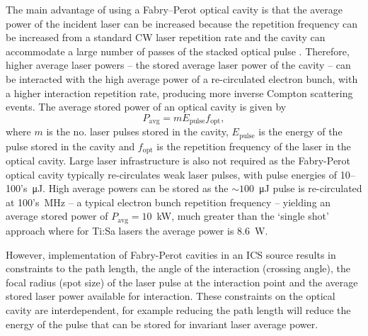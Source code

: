 \documentclass[../main.tex]{subfiles}
\begin{document}
The main advantage of using a Fabry--Perot optical cavity is that the average power of the incident laser can be increased because the repetition frequency can be increased from a standard CW laser repetition rate and the cavity can accommodate a large number of passes of the stacked optical pulse \cite{variola2011luminosity}. Therefore, higher average laser powers -- the stored average laser power of the cavity -- can be interacted with the high average power of a re-circulated electron bunch, with a higher interaction repetition rate, producing more inverse Compton scattering events. The average stored power of an optical cavity is given by
\begin{equation}
P_{\mathrm{avg}} = mE_{\mathrm{pulse}}f_{\mathrm{opt}},
\label{eq:average_stored_power_cavity}    
\end{equation}
where $m$ is the no. laser pulses stored in the cavity, $E_{\mathrm{pulse}}$ is the energy of the pulse stored in the cavity and $f_{\mathrm{opt}}$ is the repetition frequency of the laser in the optical cavity. Large laser infrastructure is also not required as the Fabry-Perot optical cavity typically re-circulates weak laser pulses, with pulse energies of 10--100's~\si{\micro\joule}. High average powers can be stored as the $\sim100$~\si{\micro\joule} pulse is re-circulated at 100's~\si{\mega\hertz} -- a typical electron bunch repetition frequency -- yielding an average stored power of $P_{\mathrm{avg}}= 10$~\si{\kilo\watt}, much greater than the `single shot' approach where for Ti:Sa lasers the average power is 8.6~\si{\watt}.

However, implementation of Fabry-Perot cavities in an ICS source results in constraints to the path length, the angle of the interaction (crossing angle), the focal radius (spot size) of the laser pulse at the interaction point and the average stored laser power available for interaction. These constraints on the optical cavity are interdependent, for example reducing the path length will reduce the energy of the pulse that can be stored for invariant laser average power.
\end{document}
